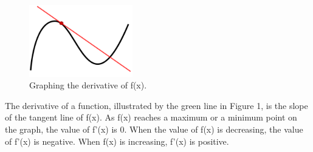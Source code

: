 \documentclass[aps,pra,notitlepage,amsmath,amssymb,letterpaper,12pt]{revtex4-1}
\begin{document}

\begin{figure}[h!] %
  \includegraphics[width=0.4\textwidth]{derivative.png}  %
  \caption{Graphing the derivative of f(x).}
  \label{fig:figlabel}
\end{figure}

The derivative of a function, illustrated by the green line in Figure 1, is the slope of the tangent line of f(x). As f(x) reaches a maximum or a minimum point on the graph, the value of f'(x) is 0. When the value of f(x) is decreasing, the value of f'(x) is negative. When f(x) is increasing, f'(x) is positive.
\end{document}
